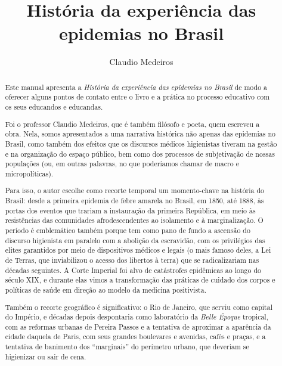 \documentclass[12pt]{extarticle}
\begin{document}
\newcommand{\AutorLivro}{Claudio Medeiros}
\newcommand{\TituloLivro}{História da experiência das epidemias no Brasil}
\newcommand{\Tema}{Diálogos com a sociologia e com a antropologia}
\newcommand{\Genero}{Narrativa histórica}
\newcommand{\imagemCapa}{./images/PNLD0061-01.png}
\newcommand{\issnppub}{---}
\newcommand{\issnepub}{---}
\newcommand{\colaborador}{\textbf{Rafael Zacca Fernandes}}


\title{\TituloLivro}
\author{\AutorLivro}
\def\authornotes{\colaborador}

\date{}
\maketitle

\begin{abstract}

Este manual apresenta a \emph{História da experiência das epidemias no
Brasil} de modo a oferecer alguns pontos de contato entre o livro e a
prática no processo educativo com os seus educandos e educandas.

Foi o professor Claudio Medeiros, que é também filósofo e poeta, quem
escreveu a obra. Nela, somos apresentados a uma narrativa histórica não
apenas das epidemias no Brasil, como também dos efeitos que os discursos
médicos higienistas tiveram na gestão e na organização do espaço
público, bem como dos processos de subjetivação de nossas populações
(ou, em outras palavras, no que poderíamos chamar de macro e
micropolíticas).

Para isso, o autor escolhe como recorte temporal um momento-chave na
história do Brasil: desde a primeira epidemia de febre amarela no
Brasil, em 1850, até 1888, às portas dos eventos que trariam a
instauração da primeira República, em meio às resistências das
comunidades afrodescendentes ao isolamento e à marginalização. O período
é emblemático também porque tem como pano de fundo a ascensão do
discurso higienista em paralelo com a abolição da escravidão, com os
privilégios das elites garantidos por meio de dispositivos médicos e
legais (o mais famoso deles, a Lei de Terras, que inviabilizou o acesso
dos libertos à terra) que se radicalizariam nas décadas seguintes. A
Corte Imperial foi alvo de catástrofes epidêmicas ao longo do século
XIX, e durante elas vimos a transformação das práticas de cuidado dos
corpos e políticas de saúde em direção ao modelo da medicina
positivista.

Também o recorte geográfico é significativo: o Rio de Janeiro, que
serviu como capital do Império, e décadas depois despontaria como
laboratório da \emph{Belle Époque} tropical, com as reformas urbanas de
Pereira Passos e a tentativa de aproximar a aparência da cidade daquela
de Paris, com seus grandes boulevares e avenidas, cafés e praças, e a
tentativa de banimento dos ``marginais'' do perímetro urbano, que
deveriam se higienizar ou sair de cena.


\end{abstract}
\end{document}

